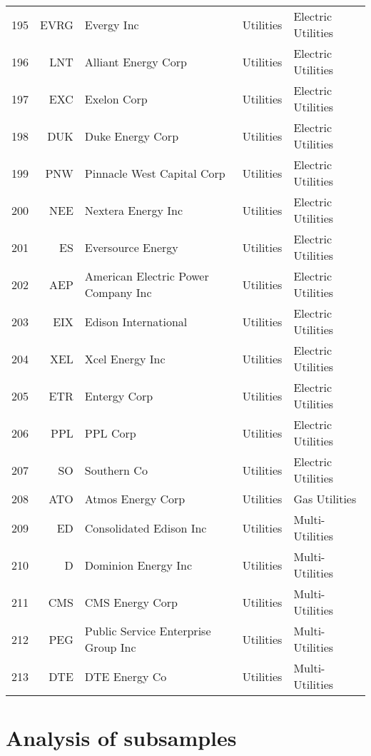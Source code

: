 \documentclass[aps, pra, groupedaddress, showkeys, twocolumn, floatfix, 10pt]{revtex4-2}
\begin{document}
{\begin{longtable}{rrllp{4cm}}
195&EVRG&Evergy Inc&Utilities&Electric Utilities \\
196&LNT&Alliant Energy Corp&Utilities&Electric Utilities \\
197&EXC&Exelon Corp&Utilities&Electric Utilities \\
198&DUK&Duke Energy Corp&Utilities&Electric Utilities \\
199&PNW&Pinnacle West Capital Corp&Utilities&Electric Utilities \\
200&NEE&Nextera Energy Inc&Utilities&Electric Utilities \\
201&ES&Eversource Energy&Utilities&Electric Utilities \\
202&AEP&American Electric Power Company Inc&Utilities&Electric Utilities \\
203&EIX&Edison International&Utilities&Electric Utilities \\
204&XEL&Xcel Energy Inc&Utilities&Electric Utilities \\
205&ETR&Entergy Corp&Utilities&Electric Utilities \\
206&PPL&PPL Corp&Utilities&Electric Utilities \\
207&SO&Southern Co&Utilities&Electric Utilities \\
208&ATO&Atmos Energy Corp&Utilities&Gas Utilities \\
209&ED&Consolidated Edison Inc&Utilities&Multi-Utilities \\
210&D&Dominion Energy Inc&Utilities&Multi-Utilities \\
211&CMS&CMS Energy Corp&Utilities&Multi-Utilities \\
212&PEG&Public Service Enterprise Group Inc&Utilities&Multi-Utilities \\
213&DTE&DTE Energy Co&Utilities&Multi-Utilities \\
		\bottomrule
	\end{longtable}
}

\newpage

\section{\label{sec:Subsamples}Analysis of subsamples}
\end{document}

